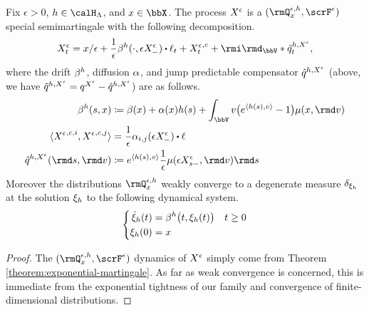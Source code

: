 \begin{proposition}
  \label{proposition:mgPrb-dynamics}
  Fix $\epsilon > 0$, $\twistFunc \in \twistSpace$, and $\stateVar \in \stateSpace$.
  The process $X^\epsilon$ is a $(\mgPrb^{\epsilon,\twistFunc}_\stateVar, \scrF^\epsilon)$ special semimartingale with the following decomposition.
  \begin{equation*}
    \Xee_t = \stateVar/\epsilon + \frac1\epsilon \affDrift^\twistFunc(\cdot, \Xe_-) \shortInt \leb_t + {\Xee_t}^{,c} + \id_\vecSpace \ast \compensate{\jumpMeas^{\twistFunc,\Xee}}_t,
  \end{equation*}
  where the drift $\beta^h$, diffusion $\alpha$, and jump predictable compensator $\hat{q}^{h,X^\epsilon}$ (above, we have $\tilde{q}^{h,X^\epsilon} = q^{X^\epsilon} - \hat{q}^{h,X^\epsilon}$) are as follows.
  \begin{align*}
    \affDrift^\twistFunc(s, \stateVar) 
    &\defeq \affDrift(\stateVar) + \affDiff(\stateVar)\twistFunc(s) + \int_\vecSpace \markVar\big(e^\prj{\twistFunc(s)}{\markVar} - 1 \big) \affJump(\stateVar, \rmd\markVar) \\
    \langle {\Xee}^{,c,i}, {\Xee}^{,c,j} \rangle &= \frac1\epsilon\affDiff_{i,j}(\Xe_-) \shortInt \leb \\
    \predproj{\jumpMeas^{\twistFunc,\Xee}}(\rmd s, \rmd\markVar)  
    &\defeq e^\prj{\twistFunc(s)}{\markVar} \frac1\epsilon \affJump(\Xe_{s-}, \rmd\markVar) \rmd s
  \end{align*}
  Moreover the distributions $\mgPrb^{\epsilon,\twistFunc}_\stateVar$ weakly converge to a degenerate measure $\delta_{\xi_h}$ at the solution $\xi_h$ to the following dynamical system.
  \begin{equation}
    \label{eq:limit-ode}
    \left\{\begin{aligned}
      \dot{\xi}_h(t) &= \beta^h\big(t, \xi_h(t)\big) & t \geq 0 \\
      \xi_h(0) &= x
    \end{aligned}\right.
  \end{equation}
\end{proposition}
\begin{proof}
  The $(\mgPrb^{\epsilon,\twistFunc}_\stateVar, \scrF^\epsilon)$ dynamics of $X^\epsilon$ simply come from Theorem \ref{theorem:exponential-martingale}.
  As far as weak convergence is concerned, this is immediate from the exponential tightness of our family and convergence of finite-dimensional distributions.
\end{proof}

